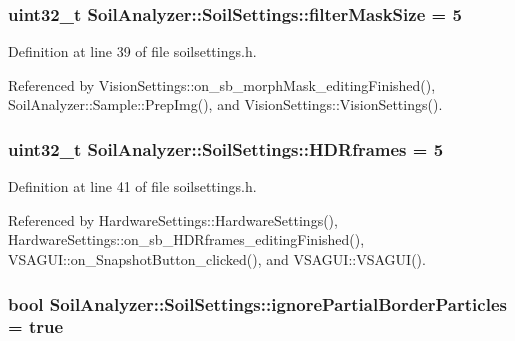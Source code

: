 \subsubsection[{filter\+Mask\+Size}]{\setlength{\rightskip}{0pt plus 5cm}uint32\+\_\+t Soil\+Analyzer\+::\+Soil\+Settings\+::filter\+Mask\+Size = 5}\label{class_soil_analyzer_1_1_soil_settings_ad9d5071bbf6d10638df024e883c6199f}


Definition at line 39 of file soilsettings.\+h.



Referenced by Vision\+Settings\+::on\+\_\+sb\+\_\+morph\+Mask\+\_\+editing\+Finished(), Soil\+Analyzer\+::\+Sample\+::\+Prep\+Img(), and Vision\+Settings\+::\+Vision\+Settings().

\hypertarget{class_soil_analyzer_1_1_soil_settings_a77e631ff44efe74762b5adaa2eb2cd11}{}
\subsubsection[{H\+D\+Rframes}]{\setlength{\rightskip}{0pt plus 5cm}uint32\+\_\+t Soil\+Analyzer\+::\+Soil\+Settings\+::\+H\+D\+Rframes = 5}\label{class_soil_analyzer_1_1_soil_settings_a77e631ff44efe74762b5adaa2eb2cd11}


Definition at line 41 of file soilsettings.\+h.



Referenced by Hardware\+Settings\+::\+Hardware\+Settings(), Hardware\+Settings\+::on\+\_\+sb\+\_\+\+H\+D\+Rframes\+\_\+editing\+Finished(), V\+S\+A\+G\+U\+I\+::on\+\_\+\+Snapshot\+Button\+\_\+clicked(), and V\+S\+A\+G\+U\+I\+::\+V\+S\+A\+G\+U\+I().

\hypertarget{class_soil_analyzer_1_1_soil_settings_a24fb1d7da2247da77a17d853ea1494d7}{}
\subsubsection[{ignore\+Partial\+Border\+Particles}]{\setlength{\rightskip}{0pt plus 5cm}bool Soil\+Analyzer\+::\+Soil\+Settings\+::ignore\+Partial\+Border\+Particles = true}\label{class_soil_analyzer_1_1_soil_settings_a24fb1d7da2247da77a17d853ea1494d7}


